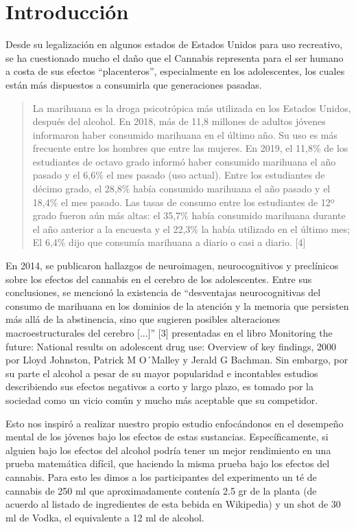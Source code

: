 \documentclass[a4paper]{report}
\begin{document}
\sloppy

\section{Introducción}
Desde su legalización en algunos estados de Estados Unidos para uso recreativo, se ha cuestionado mucho el daño que el Cannabis representa para el ser humano a costa de sus efectos “placenteros”, especialmente en los adolescentes, los cuales están más dispuestos a consumirla que generaciones pasadas. \par 
\begin{quote}
    La marihuana es la droga psicotrópica más utilizada en los Estados Unidos, después del alcohol. En 2018, más de 11,8 millones de adultos jóvenes informaron haber consumido marihuana en el último año. Su uso es más frecuente entre los hombres que entre las mujeres. En 2019, el 11,8\% de los estudiantes de octavo grado informó haber consumido marihuana el año pasado y el 6,6\% el mes pasado (uso actual). Entre los estudiantes de décimo grado, el 28,8\% había consumido marihuana el año pasado y el 18,4\% el mes pasado. Las tasas de consumo entre los estudiantes de 12º grado fueron aún más altas: el 35,7\% había consumido marihuana durante el año anterior a la encuesta y el 22,3\% la había utilizado en el último mes; El 6,4\% dijo que consumía marihuana a diario o casi a diario. [4]
\end{quote}
En 2014, se publicaron hallazgos de neuroimagen, neurocognitivos y preclínicos sobre los efectos del cannabis en el cerebro de los adolescentes. Entre sus conclusiones, se mencionó la existencia de ``desventajas neurocognitivas del consumo de marihuana en los dominios de la atención y la memoria que persisten más allá de la abstinencia, sino que sugieren posibles alteraciones macroestructurales del cerebro [...]'' [3] presentadas en el libro Monitoring the future: National results on adolescent drug use: Overview of key findings, 2000 por Lloyd Johnston, Patrick M O´Malley y Jerald G Bachman.
Sin embargo, por su parte el alcohol a pesar de su mayor popularidad e incontables estudios describiendo sus efectos negativos a corto y largo plazo, es tomado por la sociedad como un vicio común y mucho más aceptable que su competidor. \par 

Esto nos inspiró a realizar nuestro propio estudio enfocándonos en el desempeño mental de los jóvenes bajo los efectos de estas sustancias. Específicamente, si alguien bajo los efectos del alcohol podría tener un mejor rendimiento en una prueba matemática difícil, que haciendo la misma prueba bajo los efectos del cannabis. Para esto les dimos a los participantes del experimento un té de cannabis de 250 ml que aproximadamente contenía 2.5 gr de la planta (de acuerdo al listado de ingredientes de esta bebida en Wikipedia) y un shot de 30 ml de Vodka, el equivalente a 12 ml de alcohol. 
\end{document}

